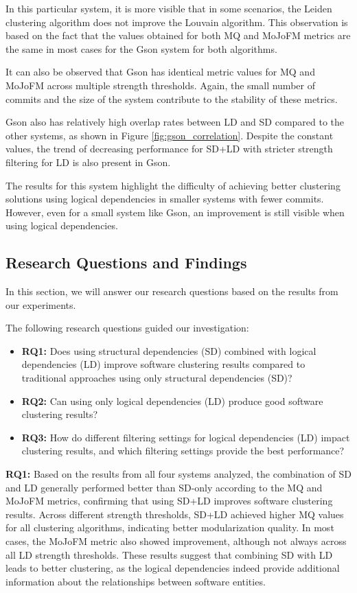 \documentclass{ieeeaccess}
\begin{document}
In this particular system, it is more visible that in some scenarios, the Leiden clustering algorithm does not improve the Louvain algorithm. This observation is based on the fact that the values obtained for both MQ and MoJoFM metrics are the same in most cases for the Gson system for both algorithms.

It can also be observed that Gson has identical metric values for MQ and MoJoFM across multiple strength thresholds. Again, the small number of commits and the size of the system contribute to the stability of these metrics. 

Gson also has relatively high overlap rates between LD and SD compared to the other systems, as shown in Figure \ref{fig:gson_correlation}. Despite the constant values, the trend of decreasing performance for SD+LD with stricter strength filtering for LD is also present in Gson.

The results for this system highlight the difficulty of achieving better clustering solutions using logical dependencies in smaller systems with fewer commits. However, even for a small system like Gson, an improvement is still visible when using logical dependencies.

\subsection{Research Questions and Findings}

In this section, we will answer our research questions based on the results from our experiments. 

The following research questions guided our investigation:

\begin{itemize}
    \item \textbf{RQ1:} Does using structural dependencies (SD) combined with logical dependencies (LD) improve software clustering results compared to traditional approaches using only structural dependencies (SD)?
    \item \textbf{RQ2:} Can using only logical dependencies (LD) produce good software clustering results?
    \item \textbf{RQ3:} How do different filtering settings for logical dependencies (LD) impact clustering results, and which filtering settings provide the best performance?
\end{itemize}

\textbf{RQ1:} Based on the results from all four systems analyzed, the combination of SD and LD generally performed better than SD-only according to the MQ and MoJoFM metrics, confirming that using SD+LD improves software clustering results. Across different strength thresholds, SD+LD achieved higher MQ values for all clustering algorithms, indicating better modularization quality. In most cases, the MoJoFM metric also showed improvement, although not always across all LD strength thresholds. These results suggest that combining SD with LD leads to better clustering, as the logical dependencies indeed provide additional information about the relationships between software entities.
\end{document}
